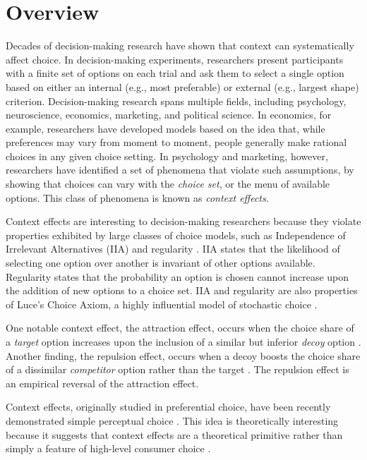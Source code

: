 \section{Overview}
Decades of decision-making research have shown that context can systematically affect choice. In decision-making experiments, researchers present participants with a finite set of options on each trial and ask them to select a single option based on either an internal (e.g., most preferable) or external (e.g., largest shape) criterion. Decision-making research spans multiple fields, including psychology, neuroscience, economics, marketing, and political science. In economics, for example, researchers have developed models based on the idea that, while preferences may vary from moment to moment, people generally make rational choices in any given choice setting. In psychology and marketing, however, researchers have identified a set of phenomena that violate such assumptions, by showing that choices can vary with the \textit{choice set}, or the menu of available options. This class of phenomena is known as \textit{context effects}.

Context effects are interesting to decision-making researchers because they violate properties exhibited by large classes of choice models, such as Independence of Irrelevant Alternatives (IIA) \parencite{ray1973independence} and regularity \parencite{mackay1995probabilistic,marley1989random}. IIA states that the likelihood of selecting one option over another is invariant of other options available. Regularity states that the probability an option is chosen cannot increase upon the addition of new options to a choice set. IIA and regularity are also properties of Luce's Choice Axiom, a highly influential model of stochastic choice \parencite{luceChoiceAxiomTwenty1977a, luce1959individual}. 

One notable context effect, the attraction effect, occurs when the choice share of a \textit{target} option increases upon the inclusion of a similar but inferior \textit{decoy} option \parencite{huberAddingAsymmetricallyDominated1982d}. Another finding, the repulsion effect, occurs when a decoy boosts the choice share of a dissimilar \textit{competitor} option rather than the target \parencite{simonson2014vices}. The repulsion effect is an empirical reversal of the attraction effect. 

Context effects, originally studied in preferential choice, have been recently demonstrated simple perceptual choice \parencite{trueblood2013not,spektorWhenGoodLooks2018b,liaoInfluenceDistanceDecoy2021,spektorRepulsionEffectPreferential2022,yearsleyContextEffectsSimilarity2022,truebloodPhantomDecoyEffect2017c, turnerCompetingTheoriesMultialternative2018a, evansImpactPresentationOrder2021}. This idea is theoretically interesting because it suggests that context effects are a theoretical primitive rather than simply a feature of high-level consumer choice \parencite{trueblood2013not}. 

